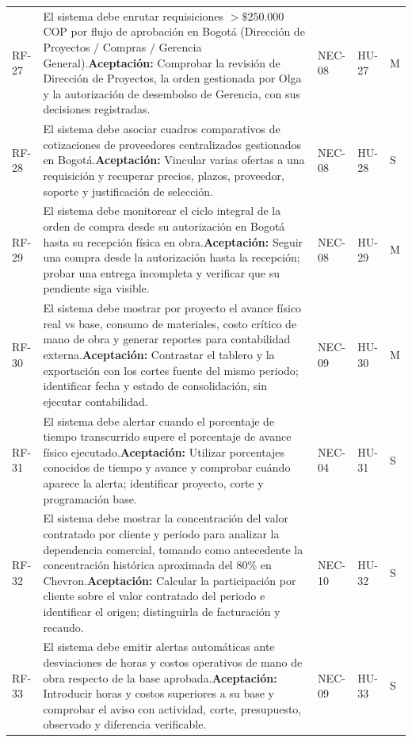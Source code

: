 \documentclass[12pt,letterpaper]{article}
\begin{document}
{\begin{longtable}{@{}L{1.6cm}L{8.05cm}L{2.0cm}L{1.5cm}L{1.2cm}@{}}
RF-27 & El sistema debe enrutar requisiciones $> \$250.000$ COP por flujo de aprobación en Bogotá (Dirección de Proyectos / Compras / Gerencia General).\newline \textbf{Aceptación:} Comprobar la revisión de Dirección de Proyectos, la orden gestionada por Olga y la autorización de desembolso de Gerencia, con sus decisiones registradas. & NEC-08 & HU-27 & M\\
RF-28 & El sistema debe asociar cuadros comparativos de cotizaciones de proveedores centralizados gestionados en Bogotá.\newline \textbf{Aceptación:} Vincular varias ofertas a una requisición y recuperar precios, plazos, proveedor, soporte y justificación de selección. & NEC-08 & HU-28 & S\\
RF-29 & El sistema debe monitorear el ciclo integral de la orden de compra desde su autorización en Bogotá hasta su recepción física en obra.\newline \textbf{Aceptación:} Seguir una compra desde la autorización hasta la recepción; probar una entrega incompleta y verificar que su pendiente siga visible. & NEC-08 & HU-29 & M\\
RF-30 & El sistema debe mostrar por proyecto el avance físico real vs base, consumo de materiales, costo crítico de mano de obra y generar reportes para contabilidad externa.\newline \textbf{Aceptación:} Contrastar el tablero y la exportación con los cortes fuente del mismo periodo; identificar fecha y estado de consolidación, sin ejecutar contabilidad. & NEC-09 & HU-30 & M\\
RF-31 & El sistema debe alertar cuando el porcentaje de tiempo transcurrido supere el porcentaje de avance físico ejecutado.\newline \textbf{Aceptación:} Utilizar porcentajes conocidos de tiempo y avance y comprobar cuándo aparece la alerta; identificar proyecto, corte y programación base. & NEC-04 & HU-31 & S\\
RF-32 & El sistema debe mostrar la concentración del valor contratado por cliente y periodo para analizar la dependencia comercial, tomando como antecedente la concentración histórica aproximada del 80\% en Chevron.\newline \textbf{Aceptación:} Calcular la participación por cliente sobre el valor contratado del periodo e identificar el origen; distinguirla de facturación y recaudo. & NEC-10 & HU-32 & S\\
RF-33 & El sistema debe emitir alertas automáticas ante desviaciones de horas y costos operativos de mano de obra respecto de la base aprobada.\newline \textbf{Aceptación:} Introducir horas y costos superiores a su base y comprobar el aviso con actividad, corte, presupuesto, observado y diferencia verificable. & NEC-09 & HU-33 & S\\

\end{longtable}}
\end{document}
